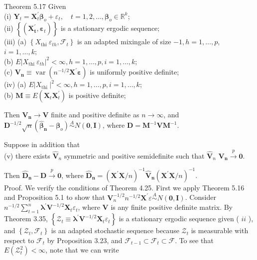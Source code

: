 \documentclass[10pt]{article}
\begin{document}
Theorem 5.17 Given\\
(i) $\mathbf{Y}_{t}=\mathbf{X}_{t}^{\prime} \boldsymbol{\beta}_{o}+\varepsilon_{t}, \quad t=1,2, \ldots, \boldsymbol{\beta}_{o} \in \mathbb{R}^{k}$;\\
(ii) $\left\{\left(\mathbf{X}_{\boldsymbol{t}}^{\prime}, \boldsymbol{\varepsilon}_{t}\right)\right\}$ is a stationary ergodic sequence;\\
(iii) (a) $\left\{X_{\text {thi }} \varepsilon_{t h}, \mathcal{F}_{t}\right\}$ is an adapted mixingale of size $-1, h=1, \ldots, p$, $i=1, \ldots, k ;$\\
(b) $E\left|X_{\text {thi }} \varepsilon_{t h}\right|^{2}<\infty, h=1, \ldots, p, i=1, \ldots, k$;\\
(c) $\mathbf{V}_{\boldsymbol{n}} \equiv \operatorname{var}\left(n^{-1 / 2} \mathbf{X}^{\prime} \boldsymbol{\varepsilon}\right)$ is uniformly positive definite;\\
(iv) (a) $E\left|X_{\text {thi }}\right|^{2}<\infty, h=1, \ldots, p, i=1, \ldots, k$;\\
(b) $\mathbf{M} \equiv E\left(\mathbf{X}_{t} \mathbf{X}_{t}^{\prime}\right)$ is positive definite;

Then $\mathbf{V}_{\boldsymbol{n}} \rightarrow \mathbf{V}$ finite and positive definite as $n \rightarrow \infty$, and $\mathbf{D}^{-1 / 2} \sqrt{n}\left(\hat{\boldsymbol{\beta}}_{\boldsymbol{n}}-\right. \left.\boldsymbol{\beta}_{o}\right) \stackrel{A}{\sim} N(\mathbf{0}, \mathbf{I})$, where $\mathbf{D}=\mathbf{M}^{-1} \mathbf{V} \mathbf{M}^{-1}$.

Suppose in addition that\\
(v) there exists $\hat{\mathbf{V}}_{n}$ symmetric and positive semidefinite such that $\hat{\mathbf{V}}_{n}$ $\mathbf{V}_{\boldsymbol{n}} \xrightarrow{p} \mathbf{0}$.

Then $\hat{\mathbf{D}}_{\boldsymbol{n}}-\mathbf{D} \xrightarrow{p} \mathbf{0}$, where $\hat{\mathbf{D}}_{\boldsymbol{n}}=\left(\mathbf{X}^{\prime} \mathbf{X} / n\right)^{-1} \hat{\mathbf{V}}_{\boldsymbol{n}}\left(\mathbf{X}^{\prime} \mathbf{X} / n\right)^{-1}$.\\
Proof. We verify the conditions of Theorem 4.25. First we apply Theorem 5.16 and Proposition 5.1 to show that $\mathbf{V}_{n}^{-1 / 2} n^{-1 / 2} \mathbf{X}^{\prime} \varepsilon \stackrel{A}{\sim} N(\mathbf{0}, \mathbf{I})$. Consider $n^{-1 / 2} \sum_{t=1}^{n} \boldsymbol{\lambda}^{\prime} \mathbf{V}^{-1 / 2} \mathbf{X}_{t} \varepsilon_{t}$, where $\mathbf{V}$ is any finite positive definite matrix. By Theorem 3.35, $\left\{\mathcal{Z}_{t} \equiv \boldsymbol{\lambda}^{\prime} \mathbf{V}^{-1 / 2} \mathbf{X}_{t} \varepsilon_{t}\right\}$ is a stationary ergodic sequence given ( $i i$ ), and $\left\{\mathcal{Z}_{t}, \mathcal{F}_{t}\right\}$ is an adapted stochastic sequence because $\mathcal{Z}_{t}$ is measurable with respect to $\mathcal{F}_{t}$ by Proposition 3.23, and $\mathcal{F}_{t-1} \subset \mathcal{F}_{t} \subset \mathcal{F}$. To see that $E\left(\mathcal{Z}_{t}^{2}\right)<\infty$, note that we can write
\end{document}
